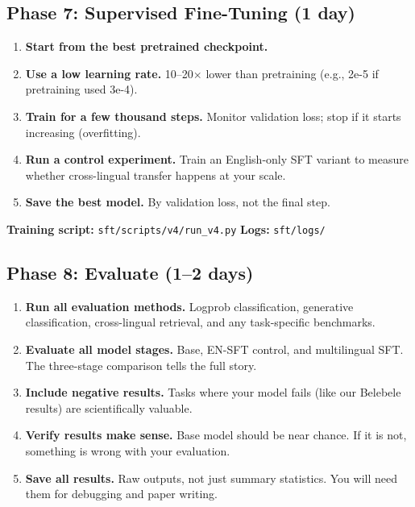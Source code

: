 \documentclass[11pt,a4paper]{article}
\begin{document}
\subsection{Phase 7: Supervised Fine-Tuning (1 day)}

\begin{enumerate}
    \item \textbf{Start from the best pretrained checkpoint.}
    
    \item \textbf{Use a low learning rate.} 10--20$\times$ lower than pretraining (e.g., 2e-5 if pretraining used 3e-4).
    
    \item \textbf{Train for a few thousand steps.} Monitor validation loss; stop if it starts increasing (overfitting).
    
    \item \textbf{Run a control experiment.} Train an English-only SFT variant to measure whether cross-lingual transfer happens at your scale.
    
    \item \textbf{Save the best model.} By validation loss, not the final step.
\end{enumerate}

\begin{reporef}
\textbf{Training script:} \texttt{sft/scripts/v4/run\_v4.py}\hfill
\textbf{Logs:} \texttt{sft/logs/}
\end{reporef}

\subsection{Phase 8: Evaluate (1--2 days)}

\begin{enumerate}
    \item \textbf{Run all evaluation methods.} Logprob classification, generative classification, cross-lingual retrieval, and any task-specific benchmarks.
    
    \item \textbf{Evaluate all model stages.} Base, EN-SFT control, and multilingual SFT. The three-stage comparison tells the full story.
    
    \item \textbf{Include negative results.} Tasks where your model fails (like our Belebele results) are scientifically valuable.
    
    \item \textbf{Verify results make sense.} Base model should be near chance. If it is not, something is wrong with your evaluation.
    
    \item \textbf{Save all results.} Raw outputs, not just summary statistics. You will need them for debugging and paper writing.
\end{enumerate}
\end{document}
